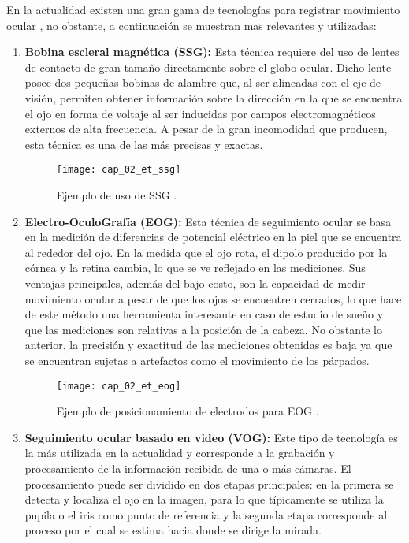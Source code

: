 \documentclass[../main.tex]{subfiles}
\begin{document}
				En la actualidad existen una gran gama de tecnologías para registrar movimiento ocular \cite{article:eyetracker_eggert, article:eyetracker_richardson, dissertation:eyetrackers}, no obstante, a continuación se muestran mas relevantes y utilizadas: 
				\begin{enumerate}
					\item \textbf{Bobina escleral magnética (SSG):} Esta técnica requiere del uso de lentes de contacto de gran tamaño directamente sobre el globo ocular. Dicho lente posee dos pequeñas bobinas de alambre que, al ser alineadas con el eje de visión, permiten obtener información sobre la dirección en la que se encuentra el ojo en forma de voltaje al ser inducidas por campos electromagnéticos externos de alta frecuencia. A pesar de la gran incomodidad que producen, esta técnica es una de las más precisas y exactas.
					\begin{figure}[H]
						\centering
						\texttt{[image: cap\_02\_et\_ssg]}
						\caption{Ejemplo de uso de SSG \cite{website:etSSG}.}
						\label{fig:02_et_ssg}
					\end{figure}

					\item \textbf{Electro-OculoGrafía (EOG):} Esta técnica de seguimiento ocular se basa en la medición de diferencias de potencial eléctrico en la piel que se encuentra al rededor del ojo. En la medida que el ojo rota, el dipolo producido por la córnea y la retina cambia, lo que se ve reflejado en las mediciones. Sus ventajas principales, además del bajo costo, son la capacidad de medir movimiento ocular a pesar de que los ojos se encuentren cerrados, lo que hace de este método una herramienta interesante en caso de estudio de sueño y que las mediciones son relativas a la posición de la cabeza. No obstante lo anterior, la precisión y exactitud de las mediciones obtenidas es baja ya que se encuentran sujetas a artefactos como el movimiento de los párpados.
					\begin{figure}[H]
						\centering
						\texttt{[image: cap\_02\_et\_eog]}
						\caption{Ejemplo de posicionamiento de electrodos para EOG \cite{website:etEOG}.}
						\label{fig:02_et_eog}
					\end{figure}

					\item \textbf{Seguimiento ocular basado en video (VOG):} Este tipo de tecnología es la más utilizada en la actualidad y corresponde a la grabación y procesamiento de la información recibida de una o más cámaras. El procesamiento puede ser dividido en dos etapas principales: en la primera se detecta y localiza el ojo en la imagen, para lo que típicamente se utiliza la pupila o el iris como punto de referencia y la segunda etapa corresponde al proceso por el cual se estima hacia donde se dirige la mirada. 


\end{enumerate}
\end{document}
